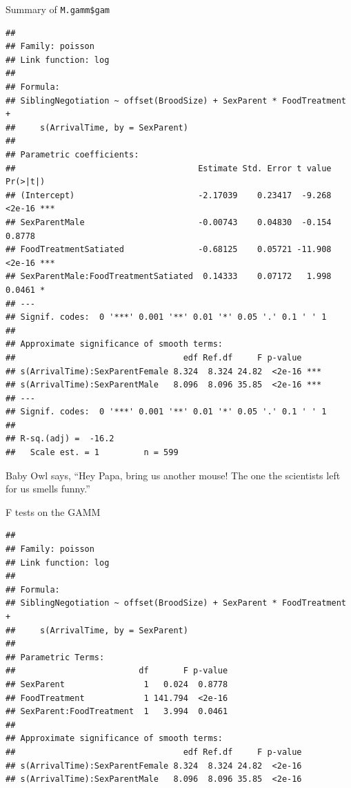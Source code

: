 \documentclass[
  ignorenonframetext,
]{beamer}
\newenvironment{Shaded}{\begin{snugshade}}{\end{snugshade}}
\newcommand{\KeywordTok}[1]{\textcolor[rgb]{0.13,0.29,0.53}{\textbf{#1}}}
\newcommand{\NormalTok}[1]{#1}
\newcommand{\OperatorTok}[1]{\textcolor[rgb]{0.81,0.36,0.00}{\textbf{#1}}}
\begin{document}
\begin{frame}[fragile]{Summary of \texttt{M.gamm\$gam}}
\protect\hypertarget{summary-of-m.gammgam}{}

\tiny

\begin{verbatim}
## 
## Family: poisson 
## Link function: log 
## 
## Formula:
## SiblingNegotiation ~ offset(BroodSize) + SexParent * FoodTreatment + 
##     s(ArrivalTime, by = SexParent)
## 
## Parametric coefficients:
##                                     Estimate Std. Error t value Pr(>|t|)    
## (Intercept)                         -2.17039    0.23417  -9.268   <2e-16 ***
## SexParentMale                       -0.00743    0.04830  -0.154   0.8778    
## FoodTreatmentSatiated               -0.68125    0.05721 -11.908   <2e-16 ***
## SexParentMale:FoodTreatmentSatiated  0.14333    0.07172   1.998   0.0461 *  
## ---
## Signif. codes:  0 '***' 0.001 '**' 0.01 '*' 0.05 '.' 0.1 ' ' 1
## 
## Approximate significance of smooth terms:
##                                  edf Ref.df     F p-value    
## s(ArrivalTime):SexParentFemale 8.324  8.324 24.82  <2e-16 ***
## s(ArrivalTime):SexParentMale   8.096  8.096 35.85  <2e-16 ***
## ---
## Signif. codes:  0 '***' 0.001 '**' 0.01 '*' 0.05 '.' 0.1 ' ' 1
## 
## R-sq.(adj) =  -16.2   
##   Scale est. = 1         n = 599
\end{verbatim}

Baby Owl says, ``Hey Papa, bring us another mouse! The one the
scientists left for us smells funny.''

\end{frame}

\begin{frame}[fragile]{F tests on the GAMM}
\protect\hypertarget{f-tests-on-the-gamm}{}

\scriptsize

\begin{Shaded}
\end{Shaded}

\begin{verbatim}
## 
## Family: poisson 
## Link function: log 
## 
## Formula:
## SiblingNegotiation ~ offset(BroodSize) + SexParent * FoodTreatment + 
##     s(ArrivalTime, by = SexParent)
## 
## Parametric Terms:
##                         df       F p-value
## SexParent                1   0.024  0.8778
## FoodTreatment            1 141.794  <2e-16
## SexParent:FoodTreatment  1   3.994  0.0461
## 
## Approximate significance of smooth terms:
##                                  edf Ref.df     F p-value
## s(ArrivalTime):SexParentFemale 8.324  8.324 24.82  <2e-16
## s(ArrivalTime):SexParentMale   8.096  8.096 35.85  <2e-16
\end{verbatim}

\end{frame}
\end{document}
